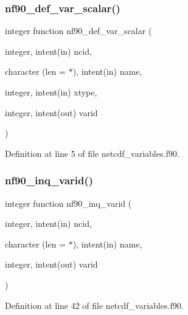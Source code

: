\subsubsection{\texorpdfstring{nf90\+\_\+def\+\_\+var\+\_\+scalar()}{nf90\_def\_var\_scalar()}}
{\footnotesize\ttfamily integer function nf90\+\_\+def\+\_\+var\+\_\+scalar (\begin{DoxyParamCaption}\item[{integer, intent(in)}]{ncid,  }\item[{character (len = $\ast$), intent(in)}]{name,  }\item[{integer, intent(in)}]{xtype,  }\item[{integer, intent(out)}]{varid }\end{DoxyParamCaption})}



Definition at line 5 of file netcdf\+\_\+variables.\+f90.

\mbox{\label{netcdf__variables_8f90_ad13ff0a76f836cb953fb402637edca20}} 
\subsubsection{\texorpdfstring{nf90\+\_\+inq\+\_\+varid()}{nf90\_inq\_varid()}}
{\footnotesize\ttfamily integer function nf90\+\_\+inq\+\_\+varid (\begin{DoxyParamCaption}\item[{integer, intent(in)}]{ncid,  }\item[{character (len = $\ast$), intent(in)}]{name,  }\item[{integer, intent(out)}]{varid }\end{DoxyParamCaption})}



Definition at line 42 of file netcdf\+\_\+variables.\+f90.

\mbox{\label{netcdf__variables_8f90_a06ba4f9a0cb129af462c8b2ff6c824a0}} 
